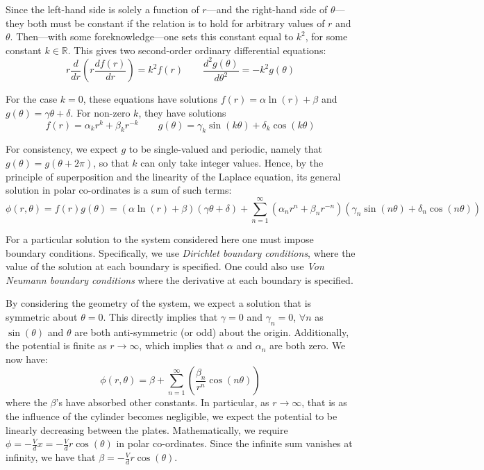 \documentclass[12pt, a4paper]{article}
\newcommand{\be}{\begin{equation}}
\newcommand{\ee}{\end{equation}}
\begin{document}
Since the left-hand side is solely a function of $r$---and the right-hand side of
$\theta$---they both must be constant if the relation is to hold for arbitrary values
of $r$ and $\theta$. Then---with some foreknowledge---one sets this constant equal to
$k^2$, for some constant $k\in\mathbb{R}$. This gives two second-order ordinary
differential equations:
%
\be
r\frac{d}{dr}(r \frac{df(r)}{dr}) = k^2 f(r) \qquad
\frac{d^2 g(\theta)}{d\theta^2}=-k^2 g(\theta)
\ee

For the case $k=0$, these equations have solutions
$f(r)=\alpha \ln(r) + \beta$ and $g(\theta) = \gamma \theta + \delta$.
For non-zero $k$, they have solutions
%
\be
f(r)=\alpha_k r^k + \beta_k r^{-k}
\qquad
g(\theta)= \gamma_k \sin(k\theta)+\delta_k \cos(k\theta)
\ee

For consistency, we expect $g$ to be single-valued and periodic, namely that
$g(\theta)=g(\theta + 2\pi)$, so that $k$ can only take integer values. Hence, by
the principle of superposition and the linearity of the Laplace equation, its general
solution in polar co-ordinates is a sum of such terms:
%
\be
\phi(r,\theta)
= f(r)g(\theta)
= (\alpha \ln(r) + \beta)(\gamma\theta + \delta) + \sum_{n=1}^{\infty}(\alpha_n r^n+\beta_n r^{-n})(\gamma_n \sin(n\theta) + \delta_n \cos(n\theta))
\ee

For a particular solution to the system considered here one must impose boundary
conditions. Specifically, we use \emph{Dirichlet boundary conditions}, where the value
of the solution at each boundary is specified. One could also use
\emph{Von Neumann boundary conditions} where the derivative at each boundary is
specified. 

By considering the geometry of the system, we expect a solution that is symmetric
about $\theta=0$. This directly implies that $\gamma = 0$ and $\gamma_n=0$, $\forall n$
as $\sin(\theta)$ and $\theta$ are both anti-symmetric (or odd) about the origin.
Additionally, the potential is finite as $r \rightarrow \infty$, which implies that
$\alpha$ and $\alpha_n$ are both zero. We now have:
%
\be
\phi(r,\theta)=\beta + \sum_{n=1}^{\infty}(\frac{\beta_n}{r^n} \cos(n\theta))
\ee
%
where the $\beta$'s have absorbed other constants. In particular, as
$r \rightarrow \infty$, that is as the influence of the cylinder becomes negligible,
we expect the potential to be linearly decreasing between the plates. Mathematically,
we require $\phi=-\frac{V}{d}x=-\frac{V}{d}r\cos(\theta)$ in polar co-ordinates.
Since the infinite sum vanishes at infinity, we have that
$\beta=-\frac{V}{d}r\cos(\theta)$.
\end{document}
